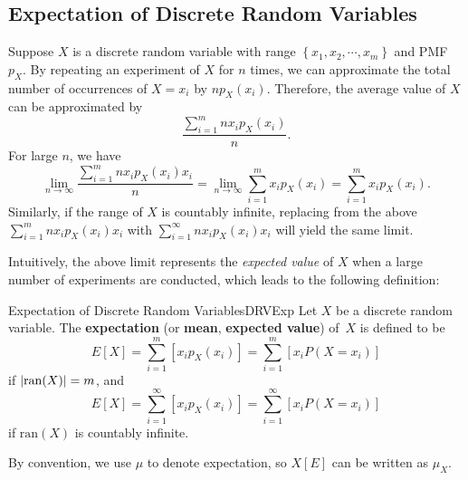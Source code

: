\documentclass[math]{amznotes}
\theoremstyle{remark}
\begin{document}
\subsection{Expectation of Discrete Random Variables}
Suppose $X$ is a discrete random variable with range $\left\{x_1, x_2, \cdots, x_m\right\}$ and PMF $p_X$. By repeating an experiment of $X$ for $n$ times, we can approximate the total number of occurrences of $X = x_i$ by $np_X(x_i)$. Therefore, the average value of $X$ can be approximated by
\begin{equation*}
    \frac{\sum_{i = 1}^{m}nx_ip_X(x_i)}{n}.
\end{equation*}
For large $n$, we have
\begin{equation*}
    \lim_{n \to \infty}\frac{\sum_{i = 1}^{m}nx_ip_X(x_i)x_i}{n} = \lim_{n \to \infty}\sum_{i = 1}^{m}x_ip_X(x_i) = \sum_{i = 1}^{m}x_ip_X(x_i).
\end{equation*}
Similarly, if the range of $X$ is countably infinite, replacing from the above $\sum_{i = 1}^{m}nx_ip_X(x_i)x_i$ with $\sum_{i = 1}^{\infty}nx_ip_X(x_i)x_i$ will yield the same limit.

Intuitively, the above limit represents the \textit{expected value} of $X$ when a large number of experiments are conducted, which leads to the following definition:
\begin{dfnbox}{Expectation of Discrete Random Variables}{DRVExp}
    Let $X$ be a discrete random variable. The {\color{red} \textbf{expectation}} (or {\color{red} \textbf{mean}}, {\color{red} \textbf{expected value}}) of~$X$ is defined to be
    \begin{equation*}
        E[X] = \sum_{i = 1}^{m}\left[x_ip_X(x_i)\right] = \sum_{i = 1}^{m}\left[x_iP(X = x_i)\right]
    \end{equation*}
    if ${\left\lvert {\mathrm{ran}(X)} \right\rvert} = m$, and
    \begin{equation*}
        E[X] = \sum_{i = 1}^{\infty}\left[x_ip_X(x_i)\right] = \sum_{i = 1}^{\infty}\left[x_iP(X = x_i)\right]
    \end{equation*}
    if $\mathrm{ran}(X)$ is countably infinite.
\end{dfnbox}
By convention, we use $\mu$ to denote expectation, so $X[E]$ can be written as $\mu_X$.
\end{document}

